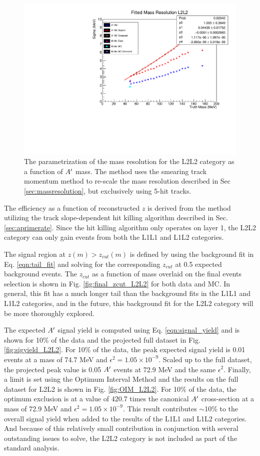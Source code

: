 \begin{figure}[t]
    \centering
    \includegraphics[width=.45\textwidth]{figs/Results/massRes_L2L2.pdf}
    \caption{The parametrization of the mass resolution for the L2L2 category as a function of $A^\prime$ mass. The method uses the smearing track momentum method to re-scale the mass resolution described in Sec \ref{sec:massresolution}, but exclusively using 5-hit tracks.}
    \label{fig:mres_L2L2}
\end{figure}

The efficiency as a function of reconstructed $z$ is derived from the method utilizing the track slope-dependent hit killing algorithm described in Sec. \ref{sec:aprimerate}. Since the hit killing algorithm only operates on layer 1, the L2L2 category can only gain events from both the L1L1 and L1L2 categories.

The signal region at $z(m)>z_{cut}(m)$ is defined by using the background fit in Eq. \ref{eqn:tail_fit} and solving for the corresponding $z_{cut}$ at 0.5 expected background events. The $z_{cut}$ as a function of mass overlaid on the final events selection is shown in Fig. \ref{fig:final_zcut_L2L2} for both data and MC. In general, this fit has a much longer tail than the background fits in the L1L1 and L1L2 categories, and in the future, this background fit for the L2L2 category will be more thoroughly explored.

The expected $A^\prime$ signal yield is computed using Eq. \ref{eqn:signal_yield} and is shown for 10\% of the data and the projected full dataset in Fig. \ref{fig:sigyield_L2L2}. For 10\% of the data, the peak expected signal yield is 0.01 events at a mass of 74.7 MeV and $\epsilon^2=1.05 \times 10^{-9}$. Scaled up to the full dataset, the projected peak value is 0.05 $A^\prime$ events at 72.9 MeV and the same $\epsilon^2$. Finally, a limit is set using the Optimum Interval Method and the results on the full dataset for L2L2 is shown in Fig. \ref{fig:OIM_L2L2}. For 10\% of the data, the optimum exclusion is at a value of 420.7 times the canonical $A^\prime$ cross-section at a mass of 72.9 MeV and $\epsilon^2=1.05 \times 10^{-9}$. This result contributes $\sim$10\% to the overall signal yield when added to the results of the L1L1 and L1L2 categories. And because of this relatively small contribution in conjunction with several outstanding issues to solve, the L2L2 category is not included as part of the standard analysis.

